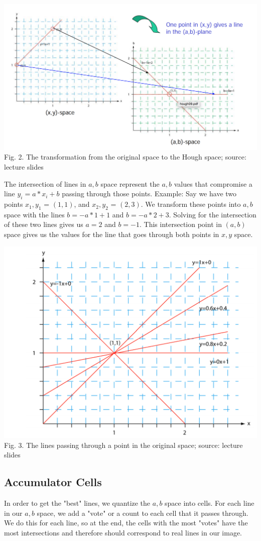 \documentclass{article}
\begin{document}
\includegraphics[width=\textwidth]{hough_transform.png}
Fig. 2. The transformation from the original space to the Hough space; source: lecture slides

The intersection of lines in $a,b$ space represent the $a,b$ values that compromise a line $y_i = a*x_i + b$ passing through those points. Example:
Say we have two points $x_1,y_1$ = $(1,1)$, and $x_2,y_2$ = $(2,3)$.
We transform these points into $a,b$ space with the lines $b = -a*1 + 1$ and $b = -a*2 + 3$.
Solving for the intersection of these two lines gives us $a=2$ and $b=-1$. This intersection point in $(a,b)$ space gives us the values for the line that goes through both points in $x,y$ space.

\includegraphics[width=\textwidth]{hough_transform2.png}
Fig. 3. The lines passing through a point in the original space; source: lecture slides

\subsection{Accumulator Cells}
In order to get the "best" lines, we quantize the $a,b$ space into cells. For each line in our $a,b$ space, we add a "vote" or a count to each cell that it passes through. We do this for each line, so at the end, the cells with the most "votes" have the most intersections and therefore should correspond to real lines in our image.
\end{document}
